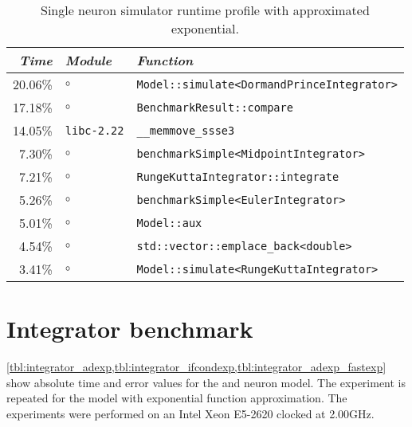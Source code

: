 \begin{table}[h]
	\caption[Simulator profile with approximated exponential]{Single neuron simulator runtime profile with approximated exponential.}
	\label{tbl:benchmark_profile_fastexp}
	\small
	\centering
	\begin{tabular}{r l l}
		\toprule
		\textit{Time} & \textit{Module} & \textit{Function} \\
		\midrule
		20.06\% & $\circ$  & \texttt{Model::simulate<DormandPrinceIntegrator>} \\
		17.18\% & $\circ$  & \texttt{BenchmarkResult::compare} \\
		14.05\% & \texttt{libc-2.22} & \texttt{\_\_memmove\_ssse3} \\
		7.30\% & $\circ$ & \texttt{benchmarkSimple<MidpointIntegrator>} \\
		7.21\% & $\circ$ & \texttt{RungeKuttaIntegrator::integrate} \\
		5.26\% & $\circ$ & \texttt{benchmarkSimple<EulerIntegrator>} \\
		5.01\% & $\circ$ & \texttt{Model::aux} \\
		4.54\% & $\circ$ & \texttt{std::vector::emplace\_back<double>} \\
		3.41\% & $\circ$ & \texttt{Model::simulate<RungeKuttaIntegrator>} \\
		\bottomrule
	\end{tabular}
\end{table}

\section{Integrator benchmark}
\label{app:integrator_benchmark}

\cref{tbl:integrator_adexp,tbl:integrator_ifcondexp,tbl:integrator_adexp_fastexp} show absolute time and error values for the \AdEx and \LIF neuron model. The experiment is repeated for the \AdEx model with exponential function approximation. The experiments were performed on an Intel Xeon \CPU E5-2620 clocked at 2.00GHz.



